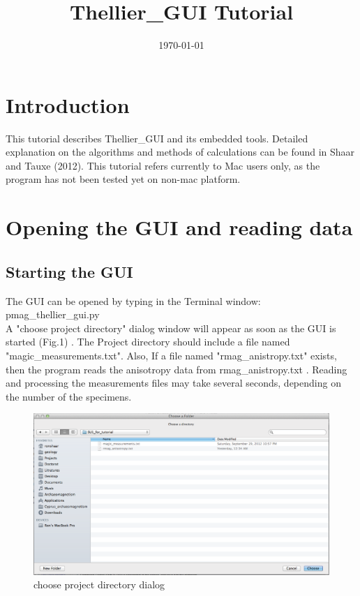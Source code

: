 \documentclass[12pt]{article}
\title{Thellier\_GUI Tutorial}
\date{\today}
\begin{document}
\maketitle


\section{Introduction}

This tutorial describes Thellier\_GUI and its embedded tools. Detailed explanation on the algorithms and methods of calculations can be found in Shaar and Tauxe (2012).  This tutorial refers currently to Mac users only, as the program has not been tested yet on non-mac platform.
 
\section{Opening the GUI and reading data}

\subsection{Starting the GUI}
The GUI can be opened by typing in the Terminal window:\\
pmag\_thellier\_gui.py\\
A "choose project directory" dialog window will appear as soon as the GUI is started (Fig.1) . The Project directory should include a file named "magic\_measurements.txt".  Also, If a file named "rmag\_anistropy.txt" exists, then the program reads the anisotropy data from rmag\_anistropy.txt . Reading and processing the measurements files may take several seconds, depending on the number of the specimens.

\begin{figure}[h!]
	\includegraphics[width=1.0\textwidth]{EPSFiles/Screenshot_choose_directory.eps}
	 \caption{choose project directory dialog}
\end{figure}
\end{document}
